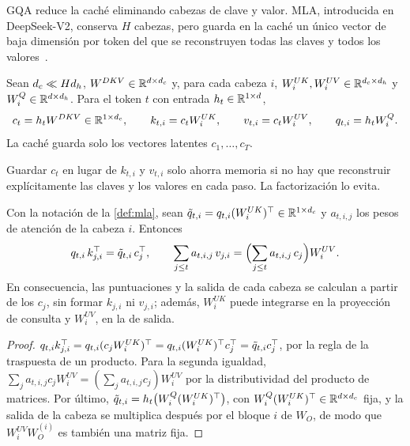 GQA reduce la caché eliminando cabezas de clave y valor. MLA, introducida en DeepSeek-V2, conserva $H$ cabezas, pero guarda en la caché un único vector de baja dimensión por token del que se reconstruyen todas las claves y todos los valores~\cite[§2.1.2]{deepseekv2}.

\begin{definicion}\label{def:mla}
Sean $d_{c}\ll Hd_{h}$, $W^{DKV}\in\mathbb{R}^{d\times d_{c}}$ y, para cada cabeza $i$, $W^{UK}_i,W^{UV}_i\in\mathbb{R}^{d_{c}\times d_{h}}$ y $W^{Q}_i\in\mathbb{R}^{d\times d_{h}}$. Para el token $t$ con entrada $h_t\in\mathbb{R}^{1\times d}$,
\[
c_t=h_tW^{DKV}\in\mathbb{R}^{1\times d_{c}},\qquad k_{t,i}=c_tW^{UK}_i,\qquad v_{t,i}=c_tW^{UV}_i,\qquad q_{t,i}=h_tW^{Q}_i .
\]
La caché guarda solo los vectores latentes $c_1,\dots,c_T$.
\end{definicion}

Guardar $c_t$ en lugar de $k_{t,i}$ y $v_{t,i}$ solo ahorra memoria si no hay que reconstruir explícitamente las claves y los valores en cada paso. La factorización lo evita.

\begin{proposicion}\label{prop:absorcion}
Con la notación de la \cref{def:mla}, sean $\tilde q_{t,i}=q_{t,i}(W^{UK}_i)^{\top}\in\mathbb{R}^{1\times d_{c}}$ y $a_{t,i,j}$ los pesos de atención de la cabeza $i$. Entonces
\[
q_{t,i}\,k_{j,i}^{\top}=\tilde q_{t,i}\,c_j^{\top},\qquad \sum_{j\le t}a_{t,i,j}\,v_{j,i}=\Bigl(\sum_{j\le t}a_{t,i,j}\,c_j\Bigr)W^{UV}_i .
\]
En consecuencia, las puntuaciones y la salida de cada cabeza se calculan a partir de los $c_j$, sin formar $k_{j,i}$ ni $v_{j,i}$; además, $W^{UK}_i$ puede integrarse en la proyección de consulta y $W^{UV}_i$, en la de salida.
\end{proposicion}

\begin{proof}
$q_{t,i}k_{j,i}^{\top}=q_{t,i}(c_jW^{UK}_i)^{\top}=q_{t,i}(W^{UK}_i)^{\top} c_j^{\top}=\tilde q_{t,i}c_j^{\top}$, por la regla de la traspuesta de un producto. Para la segunda igualdad, $\sum_j a_{t,i,j}c_jW^{UV}_i=(\sum_j a_{t,i,j}c_j)W^{UV}_i$ por la distributividad del producto de matrices. Por último, $\tilde q_{t,i}=h_t\bigl(W^{Q}_i(W^{UK}_i)^{\top}\bigr)$, con $W^{Q}_i(W^{UK}_i)^{\top}\in\mathbb{R}^{d\times d_{c}}$ fija, y la salida de la cabeza se multiplica después por el bloque $i$ de $W_O$, de modo que $W^{UV}_iW_O^{(i)}$ es también una matriz fija.
\end{proof}

